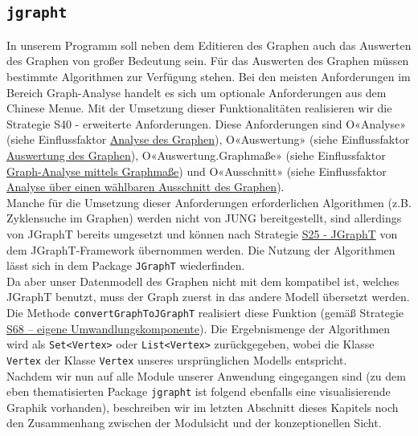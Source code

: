 \documentclass[enabledeprecatedfontcommands,fontsize=11pt,paper=a4,twoside]{scrartcl}
\newcounter{one}
\begin{document}
	
	
	\subsection{\texttt{jgrapht}}
	In unserem Programm soll neben dem Editieren des Graphen auch das Auswerten des Graphen von großer Bedeutung sein. Für das Auswerten des Graphen müssen bestimmte Algorithmen zur Verfügung stehen. Bei den meisten Anforderungen im Bereich Graph-Analyse handelt es sich um optionale Anforderungen aus dem Chinese Menue. Mit der Umsetzung dieser Funktionalitäten realisieren wir die Strategie \hypertarget{nnn}{S40 - erweiterte Anforderungen}. Diese Anforderungen sind O«Analyse» (siehe Einflussfaktor \hyperlink {oo}{Analyse des Graphen}), O«Auswertung» (siehe Einflussfaktor \hyperlink {pp}{Auswertung des Graphen}), O«Auswertung.Graphmaße» (siehe Einflussfaktor \hyperlink {qq}{Graph-Analyse mittels Graphmaße}) und O«Ausschnitt» (siehe Einflussfaktor \hyperlink {rr}{Analyse über einen wählbaren Ausschnitt des Graphen}). \\ Manche für die Umsetzung dieser Anforderungen erforderlichen Algorithmen (z.B. Zyklensuche im Graphen) werden nicht von JUNG bereitgestellt, sind allerdings von JGraphT bereits umgesetzt und können nach Strategie \hyperlink{xxx}{S25 - JGraphT} von dem JGraphT-Framework übernommen werden. Die Nutzung der Algorithmen lässt sich in dem Package \texttt{JGraphT} wiederfinden.\\
	Da aber unser Datenmodell des Graphen nicht mit dem kompatibel ist, welches JGraphT benutzt, muss der Graph zuerst in das andere Modell übersetzt werden. Die Methode \texttt{convertGraphToJGraphT} realisiert diese Funktion (gemäß Strategie \hyperlink{umwandlungskomponente}{S68 – eigene Umwandlungskomponente}). Die Ergebnismenge der Algorithmen wird als \texttt{Set<Vertex>} oder \texttt{List<Vertex>} zurückgegeben, wobei die Klasse \texttt{Vertex} der Klasse \texttt{Vertex} unseres ursprünglichen Modells entspricht. \\ 
	
	Nachdem wir nun auf alle Module unserer Anwendung eingegangen sind (zu dem eben thematisierten Package \texttt{jgrapht} ist folgend ebenfalls eine visualisierende Graphik vorhanden), beschreiben wir im letzten Abschnitt dieses Kapitels noch den Zusammenhang zwischen der Modulsicht und der konzeptionellen Sicht.
	
	
	
\end{document}

